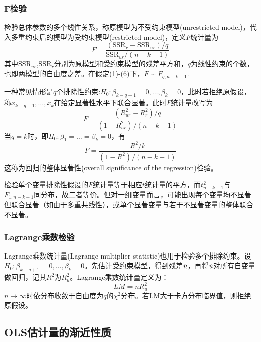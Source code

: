 \subsubsection{F检验}
\par 检验总体参数的多个线性关系，称原模型为不受约束模型(unrestricted model)，代入多重约束后的模型为受约束模型(restricted model)，定义$F$统计量为
\begin{equation}
    F=\frac{(\text{SSR}_r-\text{SSR}_{ur})/q}{\text{SSR}_{ur}/(n-k-1)}
\end{equation}
其中$\text{SSR}_{ur}$,$\text{SSR}_{r}$分别为原模型和受约束模型的残差平方和，$q$为线性约束的个数，也即两模型的自由度之差。在假定(1)-(6)下，$F\sim F_{q,n-k-1}$.
\par 一种常见情形是$q$个排除性约束:$H_0:\beta_{k-q+1}=0,\dots,\beta_{k}=0$，此时若拒绝原假设，称$x_{k-q+1},\dots,x_{k}$在给定显著性水平下联合显著。此时$F$统计量改写为
\begin{equation}
    F=\frac{(R_{ur}^2-R_{r}^2)/q}{(1-R_{ur}^2)/(n-k-1)}
\end{equation}
当$q=k$时，即$H_0:\beta_1=\dots=\beta_k=0$，有
\begin{equation}
    F=\frac{R^2/k}{(1-R^2)/(n-k-1)}
\end{equation}
这称为回归的整体显著性(overall significance of the regression)检验。

\par 检验单个变量排除性假设的$F$统计量等于相应$t$统计量的平方，而$t_{n-k-1}^2$与$F_{1,n-k-1}$同分布，故二者等价。但对一组变量而言，可能出现每个变量均不显著但联合显著（如由于多重共线性），或单个显著变量与若干不显著变量的整体联合不显著。

\subsubsection{Lagrange乘数检验}

\par Lagrange乘数统计量(Lagrange multiplier statistic)也用于检验多个排除约束。设$H_0:\beta_{k-q+1}=0,\dots,\beta_{k}=0$。先估计受约束模型，得到残差$\Tilde{u}$，再将$\Tilde{u}$对所有自变量做回归，记其$R^2$为$R_u^2$。Lagrange乘数统计量定义为：
\begin{equation}
    LM=nR_u^2
\end{equation}
$n\to \infty$时依分布收敛于自由度为$q$的$\chi^2$分布。若LM大于卡方分布临界值，则拒绝原假设。

\subsection{OLS估计量的渐近性质}

